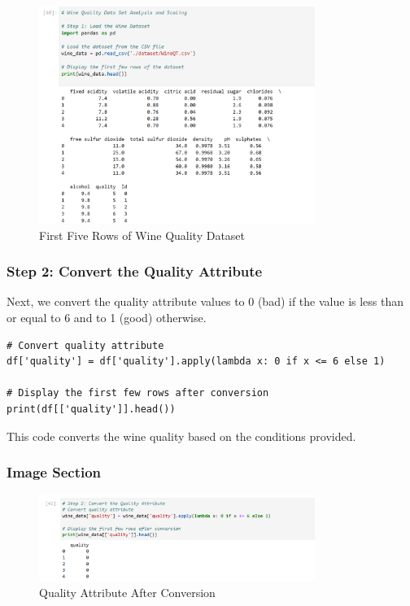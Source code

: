 \documentclass{exam}
\begin{document}
\begin{figure}[h!]
    \centering
    \includegraphics[width=0.8\textwidth]{images/wine_dataset_head.png}
    \caption{First Five Rows of Wine Quality Dataset}
    \label{fig:wine_dataset_head}
\end{figure}

\newpage

\subsubsection{Step 2: Convert the Quality Attribute}

Next, we convert the quality attribute values to 0 (bad) if the value is less than or equal to 6 and to 1 (good) otherwise.

\begin{verbatim}
# Convert quality attribute
df['quality'] = df['quality'].apply(lambda x: 0 if x <= 6 else 1)

# Display the first few rows after conversion
print(df[['quality']].head())
\end{verbatim}

This code converts the wine quality based on the conditions provided.

\subsubsection*{Image Section}

\begin{figure}[h!]
    \centering
    \includegraphics[width=0.8\textwidth]{images/quality_conversion.png}
    \caption{Quality Attribute After Conversion}
    \label{fig:quality_conversion}
\end{figure}
\end{document}
